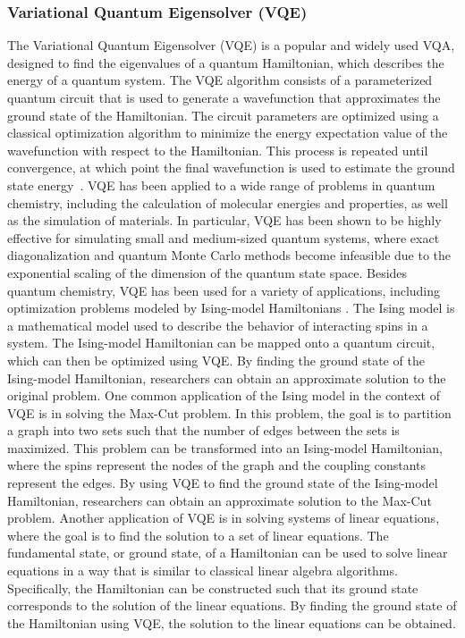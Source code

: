 \subsubsection{Variational Quantum Eigensolver (VQE)}
The Variational Quantum Eigensolver (VQE) is a popular and widely used VQA, designed to find the eigenvalues of a quantum Hamiltonian,
which describes the energy of a quantum system. The VQE algorithm consists of a parameterized quantum circuit that is used to generate a
wavefunction that approximates the ground state of the Hamiltonian. The circuit parameters are optimized using a classical optimization
algorithm to minimize the energy expectation value of the wavefunction with respect to the Hamiltonian. This process is repeated until convergence,
at which point the final wavefunction is used to estimate the ground state energy~\cite{peruzzo2014variational}.
VQE has been applied to a wide range of problems in quantum chemistry, including the calculation of molecular energies
and properties, as well as the simulation of materials. In particular, VQE has been shown to be highly effective for
simulating small and medium-sized quantum systems, where exact diagonalization and quantum Monte Carlo methods become infeasible
due to the exponential scaling of the dimension of the quantum state space.
Besides quantum chemistry, VQE has been used for a variety of applications, including optimization problems modeled by
Ising-model Hamiltonians \cite{moll2018introduction}.
The Ising model is a mathematical model used to describe the behavior of interacting spins in a system.
The Ising-model Hamiltonian can be mapped onto a quantum circuit, which can then be optimized using VQE\cite{moll2018introduction}.
By finding the ground state of the Ising-model Hamiltonian, researchers can obtain an approximate solution to the original problem.
One common application of the Ising model in the context of VQE is in solving the Max-Cut problem.
In this problem, the goal is to partition a graph into two sets such that the number of edges between the sets is maximized.
This problem can be transformed into an Ising-model Hamiltonian, where the spins represent the nodes of the graph and
the coupling constants represent the edges.
By using VQE to find the ground state of the Ising-model Hamiltonian, researchers can obtain an approximate solution to the Max-Cut problem\cite{farhi2014quantum}.
Another application of VQE is in solving systems of linear equations, where the goal is to find the solution to a set
of linear equations. The fundamental state, or ground state, of a Hamiltonian can be used to solve linear equations
in a way that is similar to classical linear algebra algorithms. Specifically, the Hamiltonian can be constructed
such that its ground state corresponds to the solution of the linear equations. By finding the ground state of the
Hamiltonian using VQE, the solution to the linear equations can be obtained\cite{harrow2009quantum}.


